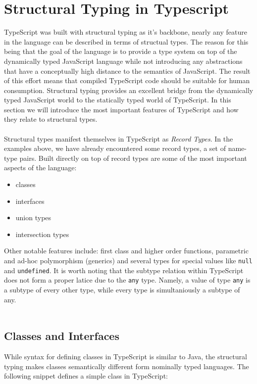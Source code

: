 \section{Structural Typing in Typescript}
\label{sec:structural-typing-typescript}
TypeScript was built with structural typing as it's backbone, 
nearly any feature in the language can be described in terms of structual types.
The reason for this being that the goal of the language is to provide a type system
on top of the dynamically typed JavaScript language while not introducing any 
abstractions that have a conceptually high distance to the semantics of JavaScript.
The result of this effort means that compiled TypeScript code should be suitable 
for human consumption. Structural typing provides an excellent bridge from the 
dynamically typed JavaScript world to the statically typed world of TypeScript.
In this section we will introduce the most important features of TypeScript and
how they relate to structural types.
\\
\\
Structural types manifest themselves in TypeScript as \textit{Record Types}.
In the examples above, we have already encountered some record types, a set of name-type pairs.
Built directly on top of record types are some of the most important aspects of the language:
\begin{itemize}
\item classes
\item interfaces
\item union types
\item intersection types
\end{itemize}

Other notable features include: first class and higher order functions, parametric and ad-hoc polymorphism 
(generics) and several types for special values like \texttt{null} and \texttt{undefined}. It is 
worth noting that the subtype relation within TypeScript does not form a proper latice due to 
the \texttt{any} type. Namely, a value of type \texttt{any} is a subtype of every other type, 
while every type is simultaniously a subtype of any.
\\
\\
\subsection{Classes and Interfaces}
While syntax for defining classes in TypeScript is similar to Java, the structural typing makes classes semantically different form nominally typed languages.
The following snippet defines a simple class in TypeScript:

